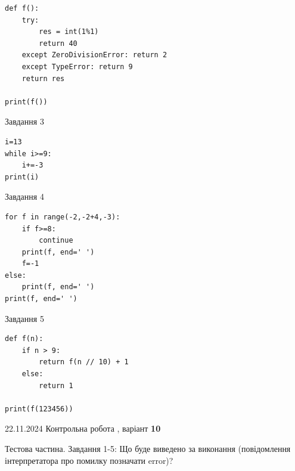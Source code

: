 \documentclass[12pt, ukrainian]{article}
\begin{document}
{{{{{{{{{\begin{minipage}[t]{8.5cm}
\begin{verbatim}
def f():
    try:
        res = int(1%1)
        return 40
    except ZeroDivisionError: return 2
    except TypeError: return 9
    return res

print(f())
\end{verbatim}


\vspace{5mm}
               
{\begin{center}Завдання {3}\end{center}}
\vspace{-6mm}

\begin{verbatim}
i=13
while i>=9:
    i+=-3
print(i)
\end{verbatim}


\end{minipage}
\vline \hspace{6mm}
\begin{minipage}[t]{10.7cm}
               
{\begin{center}Завдання {4}\end{center}}
\vspace{-6mm}

\begin{verbatim}
for f in range(-2,-2+4,-3):
    if f>=8:
        continue
    print(f, end=' ')
    f=-1
else:
    print(f, end=' ')
print(f, end=' ')
\end{verbatim}


\vspace{5mm}
               
{\begin{center}Завдання {5}\end{center}}
\vspace{-6mm}

\begin{verbatim}
def f(n):
    if n > 9:
        return f(n // 10) + 1
    else:
        return 1

print(f(123456))
\end{verbatim}


\end{minipage}

\newpage

{{22.11.2024 Контрольна робота , варіант  \No \textbf { 10 }\par}}
{

Тестова частина. Завдання 1-5: Що буде виведено за виконання (повідомлення інтерпретатора про помилку позначати error)?

}}}}}}}}}}
\end{document}
